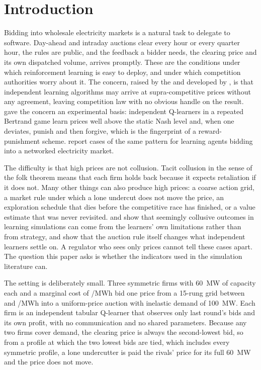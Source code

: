 \section{Introduction}\label{sec:intro}

Bidding into wholesale electricity markets is a natural task to delegate to software. Day-ahead and intraday auctions clear every hour or every quarter hour, the rules are public, and the feedback a bidder needs, the clearing price and its own dispatched volume, arrives promptly. These are the conditions under which reinforcement learning is easy to deploy, and under which competition authorities worry about it. The concern, raised by the \citet{oecd2017} and developed by \citet{harrington2018}, is that independent learning algorithms may arrive at supra-competitive prices without any agreement, leaving competition law with no obvious handle on the result. \citet{calvano2020} gave the concern an experimental basis: independent Q-learners in a repeated Bertrand game learn prices well above the static Nash level and, when one deviates, punish and then forgive, which is the fingerprint of a reward-punishment scheme. \citet{seredynski2026} report cases of the same pattern for learning agents bidding into a networked electricity market.

The difficulty is that high prices are not collusion. Tacit collusion in the sense of the folk theorem \citep{fudenberg1986} means that each firm holds back because it expects retaliation if it does not. Many other things can also produce high prices: a coarse action grid, a market rule under which a lone undercut does not move the price, an exploration schedule that dies before the competitive race has finished, or a value estimate that was never revisited. \citet{abada2023} and \citet{abada2024} show that seemingly collusive outcomes in learning simulations can come from the learners' own limitations rather than from strategy, and \citet{banchio2022} show that the auction rule itself changes what independent learners settle on. A regulator who sees only prices cannot tell these cases apart. The question this paper asks is whether the indicators used in the simulation literature can.

The setting is deliberately small. Three symmetric firms with 60~MW of capacity each and a marginal cost of /MWh bid one price from a 15-rung grid between  and /MWh into a uniform-price auction with inelastic demand of 100~MW. Each firm is an independent tabular Q-learner that observes only last round's bids and its own profit, with no communication and no shared parameters. Because any two firms cover demand, the clearing price is always the second-lowest bid, so from a profile at which the two lowest bids are tied, which includes every symmetric profile, a lone undercutter is paid the rivals' price for its full 60~MW and the price does not move.

